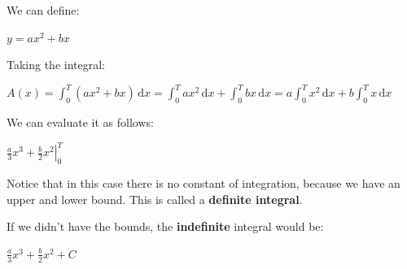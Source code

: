 \documentclass[12pt]{article}
\begin{document}
We can define:

\(y=ax^2+bx\)

Taking the integral:

\(A(x) = \int_0^T (ax^2 + bx)\,\mathrm{d}x = \int_0^T ax^2\,\mathrm{d}x
        + \int_0^T bx\,\mathrm{d}x = a\int_0^T x^2\,\mathrm{d}x
        + b\int_0^T x\,\mathrm{d}x\)

We can evaluate it as follows:

\(\left. \frac{a}{3}x^3 + \frac{b}{2}x^2 \right|_0^T\)

Notice that in this case there is no constant of integration, because we have an upper and lower bound. This is called a \textbf{definite integral}. 

If we didn't have the bounds, the \textbf{indefinite} integral would be:

\(\frac{a}{3}x^3 + \frac{b}{2}x^2+C\)
\end{document}
